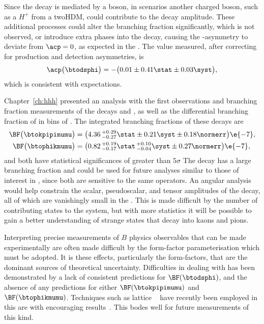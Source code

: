 Since the decay \btodsphi is mediated by a \Wp boson, in \np scenarios another charged boson, such
as a $H^+$ from a \gls{twoHDM}, could contribute to the decay amplitude.
These additional processes could alter the branching fraction significantly, which is not observed,
or introduce extra phases into the decay, causing the \CP-asymmetry to deviate from $\acp=0$, as
expected in the \sm.
The value measured, after correcting for production and detection asymmetries, is
\begin{equation*}
  \acp\big(\btodsphi\big)=
  -\big(0.01\pm0.41\stat\pm0.03\syst\big),
\end{equation*}
which is consistent with \sm expectations.



Chapter~\ref{ch:hhh} presented an analysis with the first observations and branching fraction
measurements of the decays \btokpipimumu and \btophikmumu, as well as the
differential branching fraction of \btokpipimumu in bins of \qsq.
The integrated branching fractions of these decays are
\begin{align*}
  \BF\big( \btokpipimumu \big)&=
  \big(4.36\,^{+0.29}_{-0.27}\stat\pm0.21\syst\pm0.18\normerr\big)\e{-7}, \\
  \BF\big(\btophikmumu\big)&=
  \big(0.82\,^{+0.19}_{-0.17}\stat\,^{+0.10}_{-0.04}\syst\pm0.27\normerr\big)\e{-7},
\end{align*}
and both have statistical significances of greater than $5\sigma$
The decay \btokpipimumu has a large branching fraction and could be used for future analyses
similar to those of interest in \btokstrmumu, since both are sensitive to the same operators.
An angular analysis would help constrain the scalar, pseudoscalar, and tensor amplitudes of the
decay, all of which are vanishingly small in the \sm.
This is made difficult by the number of contributing states to the \kpipi system,
but with more statistics it will be possible to gain a better understanding of
strange states that decay into kaons and pions.

Interpreting precise measurements of $B$ physics observables that can be made
experimentally are often made difficult by the form-factor parameterisation which must be adopted.
It is these \QCD effects, particularly the form-factors, that are the dominant sources of
theoretical uncertainty.
Difficulties in dealing with \QCD has been demonstrated by a lack of consistent predictions for
$\BF(\btodsphi)$, and the absence of any predictions for either $\BF(\btokpipimumu)$ and
$\BF(\btophikmumu)$.
Techniques such as lattice \QCD~\cite{Bouchard:2013pna} have recently been employed in this are
with encouraging results~\cite{RotheLattice}.
This bodes well for future measurements of this kind.

